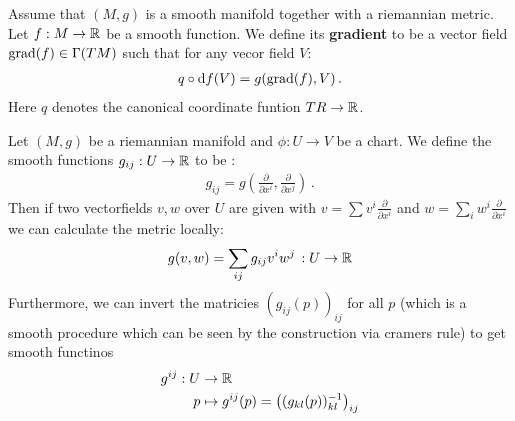 \begin{definition}
Assume that $(M,g)$ is a smooth manifold together with a riemannian metric. Let $f:M\to \mathbb{R}$ be a smooth function. We define its \textbf{gradient} to be a vector field $\mathrm{grad}(f)\in \Gamma(TM)$ such that for any vecor field $V$:
\begin{align*}
q\circ \mathop{}\!\mathrm{d} f (V) = g(\mathrm{grad}(f),V) \, .
\end{align*} Here $q$ denotes the canonical coordinate funtion $TR\to \mathbb{R}$.
\end{definition}
\begin{definition}
	Let $(M,g)$ be a riemannian manifold and $\phi:U\to V$ be a chart. We define the smooth functions $g_{ij}:U\to \mathbb{R}$ to be :
	\begin{align*}
		g_{ij}=g(\frac{\partial}{\partial x^i},\frac{\partial}{\partial x^j}) \, .
	\end{align*}
	Then if two vectorfields $v,w$ over $U$ are given with $v=\sum v^i \frac{\partial}{\partial x^i}$ and $w=\sum _i w^i \frac{\partial}{\partial x^i}$ we can calculate the metric locally:
	\begin{align*}
		g(v,w)=\sum_{ij}g_{ij} v^iw^j\, :U\to \mathbb{R}
	\end{align*} Furthermore, we can invert the matricies $(g_{ij}(p))_{ij}$ for all $p$ (which is a smooth procedure which can be seen by the construction via cramers rule) to get smooth functinos 
\begin{align*}
	g^{ij}: U&\to \mathbb{R}\\
p&\mapsto g^{ij}(p)= \left( (g_{kl}(p))_{kl}^{-1} \right)_{ij}
\end{align*}
\end{definition}


